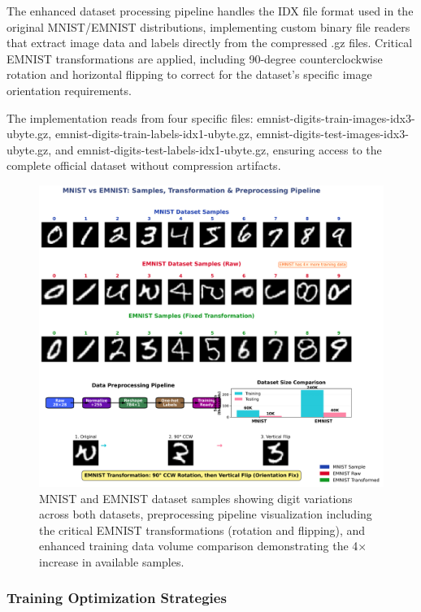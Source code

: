 \documentclass[11pt,a4paper]{report}
\begin{document}
The enhanced dataset processing pipeline handles the IDX file format used in the original MNIST/EMNIST distributions, implementing custom binary file readers that extract image data and labels directly from the compressed .gz files. Critical EMNIST transformations are applied, including 90-degree counterclockwise rotation and horizontal flipping to correct for the dataset's specific image orientation requirements.

The implementation reads from four specific files: emnist-digits-train-images-idx3-ubyte.gz, emnist-digits-train-labels-idx1-ubyte.gz, emnist-digits-test-images-idx3-ubyte.gz, and emnist-digits-test-labels-idx1-ubyte.gz, ensuring access to the complete official dataset without compression artifacts.

\begin{figure}[H]
\centering
\includegraphics[width=\textwidth]{digit_recognizer_dataset_samples.png}
\caption{MNIST and EMNIST dataset samples showing digit variations across both datasets, preprocessing pipeline visualization including the critical EMNIST transformations (rotation and flipping), and enhanced training data volume comparison demonstrating the 4× increase in available samples.}
\label{fig:digit_dataset}
\end{figure}

\subsubsection{Training Optimization Strategies}
\end{document}
